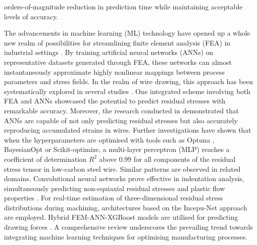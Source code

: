 \documentclass[pdflatex,sn-basic,Numbered]{sn-jnl}
\begin{document}
orders-of-magnitude reduction in prediction time while maintaining acceptable levels of accuracy.

The advancements in machine learning (ML) technology have opened up a whole new realm of possibilities for streamlining finite element analysis (FEA) in industrial settings \citep{mozaffar2022mechanistic, goodfellow2016deep, weichert2019review}. By training artificial neural networks (ANNs) on representative datasets generated through FEA, these networks can almost instantaneously approximate highly nonlinear mappings between process parameters and stress fields.
In the realm of wire drawing, this approach has been systematically explored in several studies \citep{gromov2026residual,demin2025forecasting,demin2024application}. One integrated scheme involving both FEA and ANNs \citep{gromov2026residual} showcased the potential to predict residual stresses with remarkable accuracy. Moreover, the research conducted in \citep{demin2024application} demonstrated that ANNs are capable of not only predicting residual stresses but also accurately reproducing accumulated strains in wires.
Further investigations \citep{demin2025forecasting} have shown that when the hyperparameters are optimised with tools such as Optuna \citep{akiba2019optunanextgenerationhyperparameteroptimization}, BayesianOpt or Scikit-optimize, a multi-layer perceptron (MLP) reaches a coefficient of determination $R^2$ above 0.99 for all components of the residual stress tensor in low-carbon steel wire.
Similar patterns are observed in related domains. Convolutional neural networks prove effective in indentation analysis, simultaneously predicting non-equiaxial residual stresses and plastic flow properties \citep{park2026indentation, han2024evaluation}. For real-time estimation of three-dimensional residual stress distributions during machining, architectures based on the Incepu-Net approach \citep{wang2025online} are employed. Hybrid FEM-ANN-XGBoost models are utilised for predicting drawing forces \citep{tsui2026metrology}.
A comprehensive review \citep{weichert2019review} underscores the prevailing trend towards integrating machine learning techniques for optimising manufacturing processes.
\end{document}
